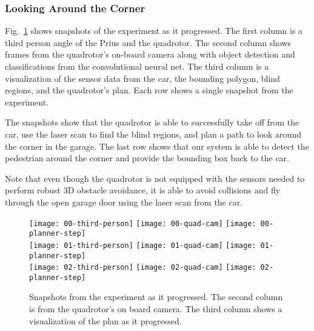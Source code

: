 
\subsubsection{Looking Around the Corner}

Fig.~\ref{fig:experiment} shows snapshots of the experiment as it progressed.
The first column is a third person angle of the Prius and the quadrotor. The
second column shows frames from the quadrotor's on-board camera along with
object detection and classifications from the convolutional neural net. The
third column is a visualization of the sensor data from the car, the bounding
polygon, blind regions, and the quadrotor's plan. Each row shows a single
snapshot from the experiment.

The snapshots show that the quadrotor is able to successfully take off from the
car, use the laser scan to find the blind regions, and plan a path to look
around the corner in the garage. The last row shows that our system is able to
detect the pedestrian around the corner and provide the bounding box back to
the car.

Note that even though the quadrotor is not equipped with the sensors needed to
perform robust 3D obstacle avoidance, it is able to avoid collisions and fly
through the open garage door using the laser scan from the car.

\begin{figure}[h!]

    \centering

    \texttt{[image: 00-third-person]}
    \texttt{[image: 00-quad-cam]}
    \texttt{[image: 00-planner-step]} \\
    \vspace*{1mm}
    \texttt{[image: 01-third-person]}
    \texttt{[image: 01-quad-cam]}
    \texttt{[image: 01-planner-step]} \\
    \vspace*{1mm}
    \texttt{[image: 02-third-person]}
    \texttt{[image: 02-quad-cam]}
    \texttt{[image: 02-planner-step]}

    \caption{Snapshots from the experiment as it progressed. The second column
        is from the quadrotor's on board camera. The third column shows a
    visualization of the plan as it progressed.}

    \label{fig:experiment}

\end{figure}

